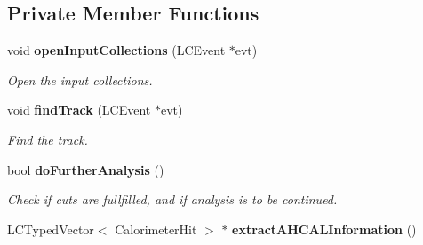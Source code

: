 \subsection*{Private Member Functions}
\begin{DoxyCompactItemize}
\item 
void {\bf open\-Input\-Collections} (L\-C\-Event $\ast$evt)
\begin{DoxyCompactList}\small\item\em Open the input collections. \end{DoxyCompactList}\item 
void {\bf find\-Track} (L\-C\-Event $\ast$evt)
\begin{DoxyCompactList}\small\item\em Find the track. \end{DoxyCompactList}\item 
bool {\bf do\-Further\-Analysis} ()
\begin{DoxyCompactList}\small\item\em Check if cuts are fullfilled, and if analysis is to be continued. \end{DoxyCompactList}\item 
L\-C\-Typed\-Vector$<$ Calorimeter\-Hit $>$ $\ast$ {\bf extract\-A\-H\-C\-A\-L\-Information} ()\label{classCALICE_1_1MipTrackFinder_a32af780e878464a7fe59b641610cc8e6}


\end{DoxyCompactItemize}
